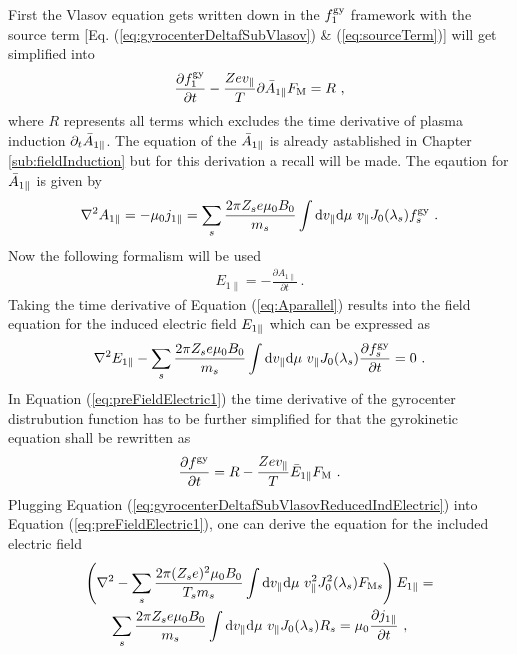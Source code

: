 First the Vlasov equation gets written down in the $f_1^{\mathrm{gy}}$ framework with the source term [Eq. (\ref{eq:gyrocenterDeltafSubVlasov}) \& (\ref{eq:sourceTerm})] will get simplified into 
\begin{gather}
    \frac{\partial f_1^{\mathrm{gy}}}{\partial t} - \frac{Ze v_\parallel}{T} \partial \bar{A}_{1\parallel} F_\mathrm{M} = R~,
    \label{eq:gyrocenterDeltafSubVlasovReduced}
\end{gather}
where $R$ represents all terms which excludes the time derivative of plasma induction $\partial_t \bar{A}_{1\parallel}$. The equation of the $\bar{A}_{1\parallel}$ is already astablished in Chapter \ref{sub:fieldInduction} but for this derivation a recall will be made. The eqaution for $\bar{A}_{1\parallel}$ is given by
\begin{gather}
    \nabla^2 A_{1 \parallel} = - \mu_0 j_{1\parallel} = \sum_s \frac{2\pi Z_se \mu_0 B_0}{m_s} \int \mathrm{d}v_\parallel\mathrm{d}\mu ~ v_\parallel J_0(\lambda_s) f^{\mathrm{gy}}_s~.
    \label{eq:Aparallel}
\end{gather}
Now the following formalism will be used
\begin{gather}
	E_{1\parallel} = - \frac{\partial A_{1\parallel}}{\partial t}~.
\end{gather}
Taking the time derivative of Equation (\ref{eq:Aparallel}) results into the field equation for the induced electric field $
E_{1\parallel}$ which can be expressed as
\begin{gather}
	\nabla^2 E_{1\parallel} - \sum_s \frac{2\pi Z_se \mu_0 B_0}{m_s} \int \mathrm{d}v_\parallel\mathrm{d}\mu ~ v_\parallel J_0(\lambda_s) \frac{\partial f^{\mathrm{gy}}_s}{\partial t} = 0 ~.
	\label{eq:preFieldElectric1}
\end{gather}
In Equation (\ref{eq:preFieldElectric1}) the time derivative of the gyrocenter distrubution function has to be further simplified for that the gyrokinetic equation shall be rewritten as 
\begin{gather}
	\frac{\partial f^{\mathrm{gy}}}{\partial t} = R - \frac{Ze v_\parallel}{T} \bar{E}_{1\parallel} F_\mathrm{M}~.
	\label{eq:gyrocenterDeltafSubVlasovReducedIndElectric}
\end{gather}
Plugging Equation (\ref{eq:gyrocenterDeltafSubVlasovReducedIndElectric}) into Equation (\ref{eq:preFieldElectric1}), one can derive the equation for the included electric field 
\begin{gather}
	\left(\nabla^2 - \sum_s \frac{2\pi (Z_se)^2 \mu_0 B_0}{T_sm_s}  \int \mathrm{d}v_\parallel\mathrm{d}\mu ~ v_\parallel^2 J_0^2(\lambda_s) F_{\mathrm{M}s} \right) E_{1\parallel} = \\
	\sum_s \frac{2\pi Z_se \mu_0 B_0}{m_s}  \int \mathrm{d}v_\parallel\mathrm{d}\mu ~ v_\parallel J_0(\lambda_s) R_s = \mu_0 \frac{\partial j_{1\parallel}}{\partial t}~,
	\label{eq:prefieldElectric2}
\end{gather}
